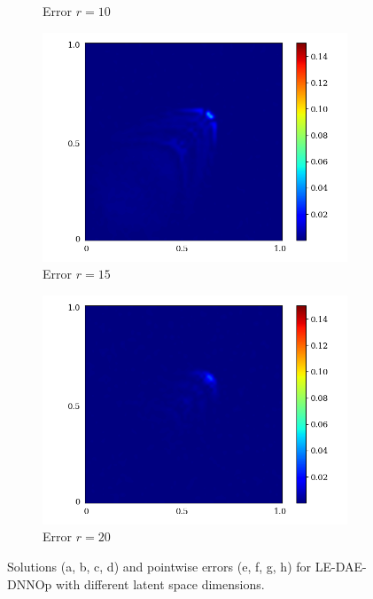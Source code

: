 \begin{figure}[ht!]
\begin{center}
\begin{subfigure}[b]{0.20\textwidth}
\begin{center}
            \end{center}
            \caption{Error $r = 10$}
        \end{subfigure}   
        \begin{subfigure}[b]{0.20\textwidth}
            \begin{center}
                \includegraphics[trim = {0, 0, 3cm, 0}, clip, width=\textwidth]{Pictures/X-rom-LE-DAE-15-abs-err.png}
            \end{center}
            \caption{Error $r = 15$}
        \end{subfigure}    
        \begin{subfigure}[b]{0.20\textwidth}
            \begin{center}
                \includegraphics[trim = {0, 0, 3cm, 0}, clip, width=\textwidth]{Pictures/X-rom-LE-DAE-20-abs-err.png}
            \end{center}
            \caption{Error $r = 20$}
        \end{subfigure}
     \end{center}
     \caption[Solutions and pointwise errors for LE-DAE-DNNOp.]{Solutions (a, b, c, d) and pointwise errors (e, f, g, h) for LE-DAE-DNNOp with different latent space dimensions.}
        \label{fig: ledae-burger}
\end{figure}

